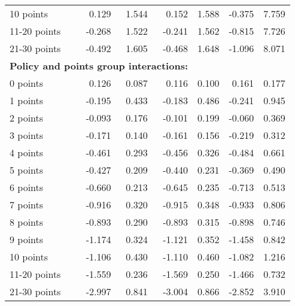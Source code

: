 \begin{table}
\begin{tabular}{l r r r r r r}
10 points  &  0.129  &  1.544  &  0.152  &  1.588  & -0.375  &  7.759   \\ 
 
11-20 points  & -0.268  &  1.522  & -0.241  &  1.562  & -0.815  &  7.726   \\ 
 
21-30 points  & -0.492  &  1.605  & -0.468  &  1.648  & -1.096  &  8.071   \\ 
 

\hline 
 
\multicolumn{4}{l}{\textbf{Policy and points group interactions:}}  \\ 
 
0 points  &  0.126  &  0.087  &  0.116  &  0.100  &  0.161  &  0.177   \\ 
 
1 points  & -0.195  &  0.433  & -0.183  &  0.486  & -0.241  &  0.945   \\ 
 
2 points  & -0.093  &  0.176  & -0.101  &  0.199  & -0.060  &  0.369   \\ 
 
3 points  & -0.171  &  0.140  & -0.161  &  0.156  & -0.219  &  0.312   \\ 
 
4 points  & -0.461  &  0.293  & -0.456  &  0.326  & -0.484  &  0.661   \\ 
 
5 points  & -0.427  &  0.209  & -0.440  &  0.231  & -0.369  &  0.490   \\ 
 
6 points  & -0.660  &  0.213  & -0.645  &  0.235  & -0.713  &  0.513   \\ 
 
7 points  & -0.916  &  0.320  & -0.915  &  0.348  & -0.933  &  0.806   \\ 
 
8 points  & -0.893  &  0.290  & -0.893  &  0.315  & -0.898  &  0.746   \\ 
 
9 points  & -1.174  &  0.324  & -1.121  &  0.352  & -1.458  &  0.842   \\ 
 
10 points  & -1.106  &  0.430  & -1.110  &  0.460  & -1.082  &  1.216   \\ 
 
11-20 points  & -1.559  &  0.236  & -1.569  &  0.250  & -1.466  &  0.732   \\ 
 
21-30 points  & -2.997  &  0.841  & -3.004  &  0.866  & -2.852  &  3.910   \\ 
 

\end{tabular}
\end{table}
